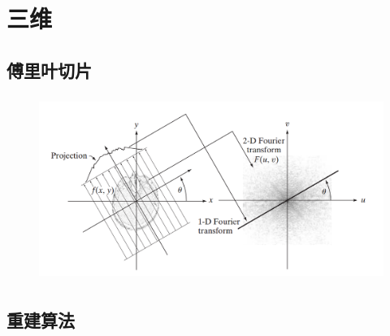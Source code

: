 \documentclass[12pt,aspectratio=169]{beamer} %
\begin{document}
\section{三维}

\subsection{傅里叶切片}

\begin{frame}
    \begin{figure}
        \includegraphics[height=6cm]{images/20180410092110702.png}
    \end{figure}
\end{frame}

\subsection{重建算法}
\end{document}
